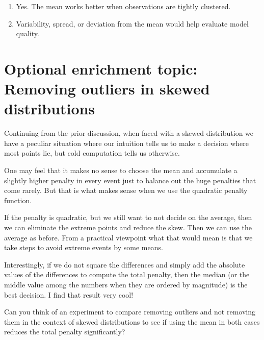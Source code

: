 \documentclass[
  12pt,
  letterpaper,
  DIV=11,
  numbers=noendperiod]{scrreprt}
\providecommand{\tightlist}{%
  \setlength{\itemsep}{0pt}\setlength{\parskip}{0pt}}
\begin{document}
\begin{tcolorbox}[enhanced jigsaw, colback=white, leftrule=.75mm, toprule=.15mm, bottomtitle=1mm, breakable, coltitle=black, toptitle=1mm, title={Suggested answers}, opacitybacktitle=0.6, colbacktitle=quarto-callout-note-color!10!white, arc=.35mm, left=2mm, colframe=quarto-callout-note-color-frame, titlerule=0mm, rightrule=.15mm, bottomrule=.15mm, opacityback=0]

\begin{enumerate}
\def\labelenumi{\arabic{enumi}.}
\tightlist
\item
  Yes. The mean works better when observations are tightly clustered.
\item
  Variability, spread, or deviation from the mean would help evaluate
  model quality.
\end{enumerate}

\end{tcolorbox}

\section{Optional enrichment topic: Removing outliers in skewed
distributions}\label{sec-simple-model-enrichment-1}

Continuing from the prior discussion, when faced with a skewed
distribution we have a peculiar situation where our intuition tells us
to make a decision where most points lie, but cold computation tells us
otherwise.

One may feel that it makes no sense to choose the mean and accumulate a
slightly higher penalty in every event just to balance out the huge
penalties that come rarely. But that is what makes sense when we use the
quadratic penalty function.

If the penalty is quadratic, but we still want to not decide on the
average, then we can eliminate the extreme points and reduce the skew.
Then we can use the average as before. From a practical viewpoint what
that would mean is that we take steps to avoid extreme events by some
means.

Interestingly, if we do not square the differences and simply add the
absolute values of the differences to compute the total penalty, then
the median (or the middle value among the numbers when they are ordered
by magnitude) is the best decision. I find that result very cool!

Can you think of an experiment to compare removing outliers and not
removing them in the context of skewed distributions to see if using the
mean in both cases reduces the total penalty significantly?
\end{document}
